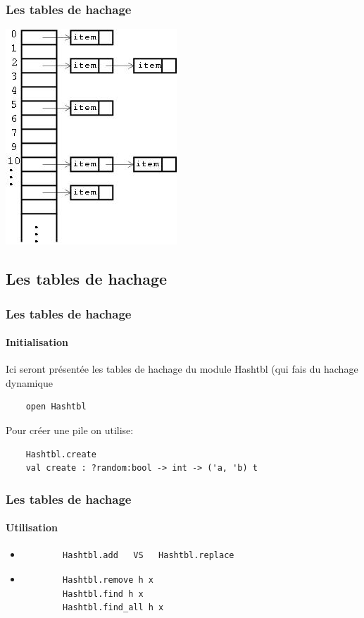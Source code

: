 \begin{frame}
	\frametitle{Les tables de hachage}
	\includegraphics[scale=0.6]{pics/hash.jpg}
\end{frame}

\subsection{Les tables de hachage}
\begin{frame}[fragile]
\frametitle{Les tables de hachage}
\framesubtitle{Initialisation}
	Ici seront présentée les tables de hachage du module Hashtbl (qui fais du hachage dynamique
	\begin{lstlisting}
	open Hashtbl
	\end{lstlisting}
	Pour créer une pile on utilise:
	\begin{lstlisting}
	Hashtbl.create
	val create : ?random:bool -> int -> ('a, 'b) t
	\end{lstlisting}
\end{frame}

\begin{frame}[fragile]
\frametitle{Les tables de hachage}
\framesubtitle{Utilisation}
	\begin{itemize}
	
	\item
		\begin{lstlisting}
		Hashtbl.add   VS   Hashtbl.replace
		\end{lstlisting}	
	
	\item
		\begin{lstlisting}
		Hashtbl.remove h x
		Hashtbl.find h x
		Hashtbl.find_all h x
		\end{lstlisting}	

	\end{itemize}


\end{frame}

